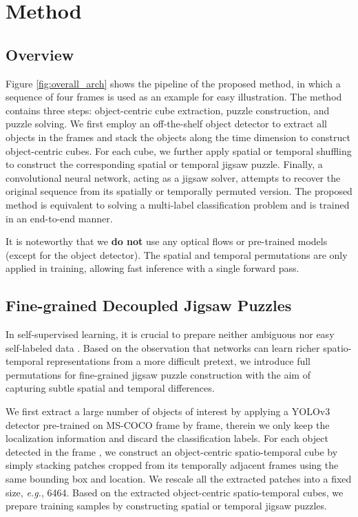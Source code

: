 \documentclass[runningheads]{llncs}
\begin{document}
\section{Method}


\subsection{Overview}

Figure \ref{fig:overall_arch} shows the pipeline of the proposed method, in which a sequence of four frames is used as an example for easy illustration. The method contains three steps: object-centric cube extraction, puzzle construction, and puzzle solving. We first employ an off-the-shelf object detector \cite{redmon2018yolov3} to extract all objects in the frames and stack the objects along the time dimension to construct object-centric cubes. For each cube, we further apply spatial or temporal shuffling to construct the corresponding spatial or temporal jigsaw puzzle. Finally, a convolutional neural network, acting as a jigsaw solver, attempts to recover the original sequence from its spatially or temporally permuted version. The proposed method is equivalent to solving a multi-label classification problem and is trained in an end-to-end manner.


It is noteworthy that we \textbf{do not} use any optical flows or pre-trained models (except for the object detector). The spatial and temporal permutations are only applied in training, allowing fast inference with a single forward pass.

\subsection{Fine-grained Decoupled Jigsaw Puzzles}

In self-supervised learning, it is crucial to prepare neither ambiguous nor easy self-labeled data \cite{noroozi2016unsupervised}. Based on the observation \cite{noroozi2016unsupervised, lee2017unsupervised} that networks can learn richer spatio-temporal representations from a more difficult pretext, we introduce full permutations for fine-grained jigsaw puzzle construction with the aim of capturing subtle spatial and temporal differences.

We first extract a large number of objects of interest by applying a YOLOv3 detector \cite{redmon2018yolov3} pre-trained on MS-COCO \cite{lin2014microsoft} frame by frame, therein we only keep the localization information and discard the classification labels. For each object detected in the frame , we construct an object-centric spatio-temporal cube by simply stacking patches cropped from its temporally adjacent frames  using the same bounding box and location. We rescale all the extracted patches into a fixed size, \emph{e.g.}, 6464. Based on the extracted object-centric spatio-temporal cubes, we prepare training samples by constructing spatial or temporal jigsaw puzzles.
\end{document}
